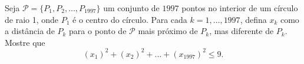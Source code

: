 Seja $\mathcal{P} = \{P_1, P_2, ..., P_{1997}\}$ um conjunto de $1997$ pontos no interior de um círculo de raio 1, onde $P_1$ é o centro do círculo.
Para cada $k = 1, \dots, 1997$, defina $x_k$ como a distância de $P_k$ para o ponto de $\mathcal{P}$ mais próximo de $P_k$, mas diferente de $P_k$. Mostre que $$(x_1)^2 + (x_2)^2 + ... + (x_{1997})^2 \le 9.$$
